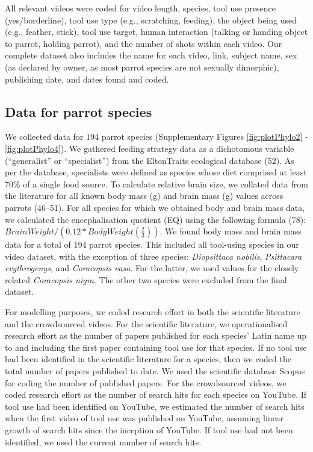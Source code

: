 \documentclass[
  man, donotrepeattitle,floatsintext]{apa6}
\begin{document}
All relevant videos were coded for video length, species, tool use presence
(yes/borderline), tool use type (e.g., scratching, feeding), the object being
used (e.g., feather, stick), tool use target, human interaction
(talking or handing object to parrot, holding parrot), and the number of shots
within each video. Our complete dataset also includes the name for each video,
link, subject name, sex (as declared by owner, as most parrot species are not
sexually dimorphic), publishing date, and dates found and coded.

\hypertarget{data-for-parrot-species}{%
\subsection{Data for parrot species}\label{data-for-parrot-species}}

We collected data for 194 parrot species (Supplementary Figures
\ref{fig:plotPhylo2} - \ref{fig:plotPhylo4}). We gathered feeding strategy
data as a dichotomous variable (``generalist'' or ``specialist'') from the
EltonTraits ecological database (52). As per the database, specialists
were defined as species whose diet comprised at least 70\% of a single food
source. To calculate relative brain size, we collated data from the literature
for all known body mass (g) and brain mass (g) values across
parrots (46--51). For all species for which we obtained body and brain mass data, we
calculated the encephalisation quotient (EQ) using the following
formula (78): \(BrainWeight / (0.12 * BodyWeight(\frac{2}{3}))\). We
found body mass and brain mass data for a total of 194 parrot species. This
included all tool-using species in our video dataset, with the exception of
three species: \emph{Diopsittaca nobilis}, \emph{Psittacara erythrogenys}, and \emph{Coracopsis
vasa}. For the latter, we used values for the closely related \emph{Coracopsis
nigra}. The other two species were excluded from the final dataset.

For modelling purposes, we coded research effort in both the scientific
literature and the crowdsourced videos. For the scientific literature, we
operationalised research effort as the number of papers published for each
species' Latin name up to and including the first paper containing tool use for
that species. If no tool use had been identified in the scientific literature
for a species, then we coded the total number of papers published to date. We
used the scientific database Scopus for coding the number of published papers.
For the crowdsourced videos, we coded research effort as the number of search
hits for each species on YouTube. If tool use had been identified on YouTube, we
estimated the number of search hits when the first video of tool use was
published on YouTube, assuming linear growth of search hits since the inception
of YouTube. If tool use had not been identified, we used the current number of
search hits.
\end{document}
